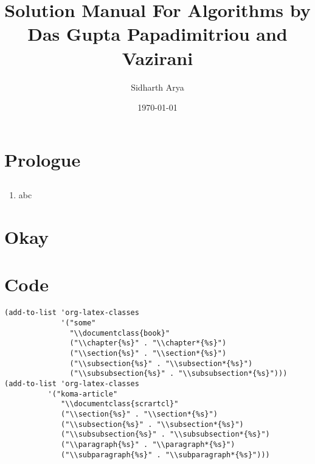 \documentclass{book}
\author{Sidharth Arya}
\date{\today}
\title{Solution Manual For Algorithms by Das Gupta Papadimitriou and Vazirani}
\begin{document}
\maketitle
\frontmatter
\setcounter{tocdepth}{0}
\tableofcontents
\chapter{Prologue}
\label{sec:orgdfe432b}
\section{}
\label{sec:orga150654}
\begin{enumerate} [label=\alph*]
\item abc
\mainmatter
\end{enumerate}
\chapter{Okay}
\label{sec:org0ab7c40}
\backmatter
\chapter{Code}
\label{sec:orge7c152c}
\begin{verbatim}
(add-to-list 'org-latex-classes
             '("some"
               "\\documentclass{book}"
               ("\\chapter{%s}" . "\\chapter*{%s}")
               ("\\section{%s}" . "\\section*{%s}")
               ("\\subsection{%s}" . "\\subsection*{%s}")
               ("\\subsubsection{%s}" . "\\subsubsection*{%s}")))
(add-to-list 'org-latex-classes
          '("koma-article"
             "\\documentclass{scrartcl}"
             ("\\section{%s}" . "\\section*{%s}")
             ("\\subsection{%s}" . "\\subsection*{%s}")
             ("\\subsubsection{%s}" . "\\subsubsection*{%s}")
             ("\\paragraph{%s}" . "\\paragraph*{%s}")
             ("\\subparagraph{%s}" . "\\subparagraph*{%s}")))
\end{verbatim}
\end{document}
